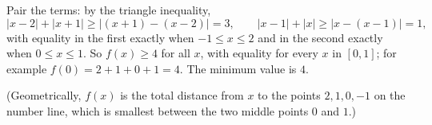 Pair the terms: by the triangle inequality,
\[
|x-2|+|x+1|\ge|(x+1)-(x-2)|=3,\qquad |x-1|+|x|\ge|x-(x-1)|=1,
\]
with equality in the first exactly when $-1\le x\le2$ and in the second exactly when $0\le x\le1$. So $f(x)\ge4$ for all $x$, with equality for every $x$ in $[0,1]$; for example $f(0)=2+1+0+1=4$. The minimum value is $\boxed{4}$.

(Geometrically, $f(x)$ is the total distance from $x$ to the points $2,1,0,-1$ on the number line, which is smallest between the two middle points $0$ and $1$.)
